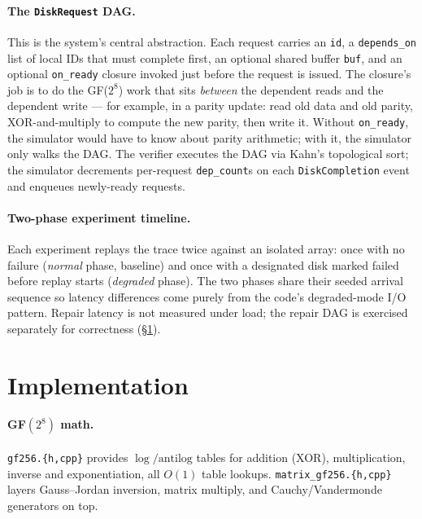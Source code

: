 \documentclass[letterpaper,twocolumn,10pt]{article}
\begin{document}
\paragraph{The \texttt{DiskRequest} DAG.} This is the system's central
abstraction. Each request carries an \texttt{id}, a \texttt{depends\_on}
list of local IDs that must complete first, an optional shared buffer
\texttt{buf}, and an optional \texttt{on\_ready} closure invoked just before
the request is issued. The closure's job is to do the GF($2^8$) work that
sits \emph{between} the dependent reads and the dependent write --- for
example, in a parity update: read old data and old parity, XOR-and-multiply
to compute the new parity, then write it. Without \texttt{on\_ready}, the
simulator would have to know about parity arithmetic; with it, the
simulator only walks the DAG. The verifier executes the DAG via Kahn's
topological sort; the simulator decrements per-request \texttt{dep\_count}s
on each \texttt{DiskCompletion} event and enqueues newly-ready requests.

\paragraph{Two-phase experiment timeline.}
Each experiment replays the trace twice against an isolated array: once
with no failure (\emph{normal} phase, baseline) and once with a designated
disk marked failed before replay starts (\emph{degraded} phase). The two
phases share their seeded arrival sequence so latency differences come
purely from the code's degraded-mode I/O pattern. Repair latency is not
measured under load; the repair DAG is exercised separately for correctness
(\S\ref{sec:impl}).

\section{Implementation}
\label{sec:impl}

\paragraph{GF$(2^8)$ math.}
\texttt{gf256.\{h,cpp\}} provides $\log/\mathrm{antilog}$ tables for
addition (XOR), multiplication, inverse and exponentiation, all $O(1)$
table lookups. \texttt{matrix\_gf256.\{h,cpp\}} layers Gauss--Jordan inversion,
matrix multiply, and Cauchy/Vandermonde generators on top.
\end{document}
